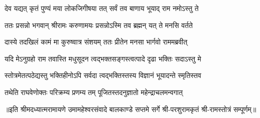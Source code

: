 \twolineshloka
{देव यद्यत् कृतं पुण्यं मया लोकजिगीषया}
{तत् सर्वं तव बाणाय भूयाद् राम नमोऽस्तु ते} %

\twolineshloka
{ततः प्रसन्नो भगवान् श्रीरामः करुणामयः}
{प्रसन्नोऽस्मि तव ब्रह्मन् यत् ते मनसि वर्तते} %

\twolineshloka
{दास्ये तदखिलं कामं मा कुरुष्वात्र संशयम्}
{ततः प्रीतेन मनसा भार्गवो राममब्रवीत्} %

\twolineshloka
{यदि मेऽनुग्रहो राम तवास्ति मधुसूदन}
{त्वद्भक्तसङ्गस्त्वत्पादे दृढा भक्तिः सदाऽस्तु मे} %

\twolineshloka
{स्तोत्रमेतत्पठेद्यस्तु भक्तिहीनोऽपि सर्वदा}
{त्वद्भक्तिस्तस्य विज्ञानं भूयादन्ते स्मृतिस्तव} %

\twolineshloka
{तथेति राघवेणोक्तः परिक्रम्य प्रणम्य तम्}
{पूजितस्तदनुज्ञातो महेन्द्राचलमन्वगात्} %

{॥इति श्रीमदध्यात्मरामायणे उमामहेश्वरसंवादे बालकाण्डे
सप्तमे  सर्गे श्री-परशुरामकृतं श्री-रामस्तोत्रं सम्पूर्णम्॥}
